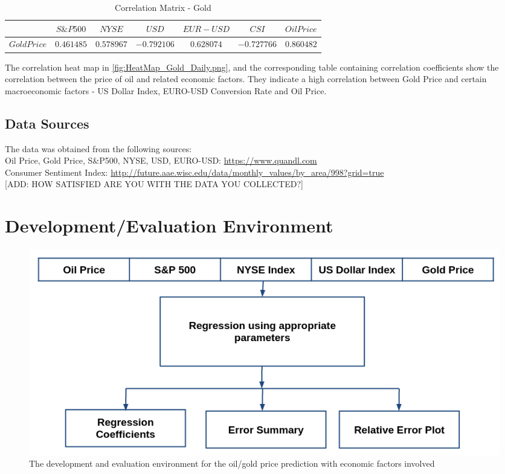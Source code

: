 \documentclass[runningheads]{llncs}
\begin{document}
\begin{table}
\begin{center}
\begin{tabular}{|c|c|c|c|c|c|c|}
\hline
$ $ & $ S\&P 500 $ & $ NYSE $ & $ USD $ & $EUR-USD$ & $CSI$ &$Oil Price$ \\  \hline
$Gold Price$ & $0.461485$ & $0.578967$ & $-0.792106$ & $0.628074$ & $-0.727766$ & $0.860482$ \\ \hline
\end{tabular}
\end{center}
\caption{Correlation Matrix - Gold}
\end{table}

The correlation heat map in \autoref{fig:HeatMap_Gold_Daily.png}, and the corresponding table containing correlation coefficients show the correlation between the price of oil and related economic factors. They indicate a high correlation between Gold Price and certain macroeconomic factors - US Dollar Index, EURO-USD Conversion Rate and Oil Price.


\subsection{Data Sources}
The data was obtained from the following sources:\\

\noindent  Oil Price, Gold Price, S\&P500, NYSE, USD, EURO-USD: \url{https://www.quandl.com} \\
\noindent  Consumer Sentiment Index: \url{http://future.aae.wisc.edu/data/monthly_values/by_area/998?grid=true} \\


[ADD: HOW SATISFIED ARE YOU WITH THE DATA YOU COLLECTED?]

\section{Development/Evaluation Environment}

\begin{figure}
\centering
\includegraphics[width=\textwidth]{DevelopmentFlowchart.png}
\caption{The development and evaluation environment for the oil/gold price prediction with economic factors involved}
\label{fig:DevelopmentFlowchart.png}
\end{figure}
\end{document}
